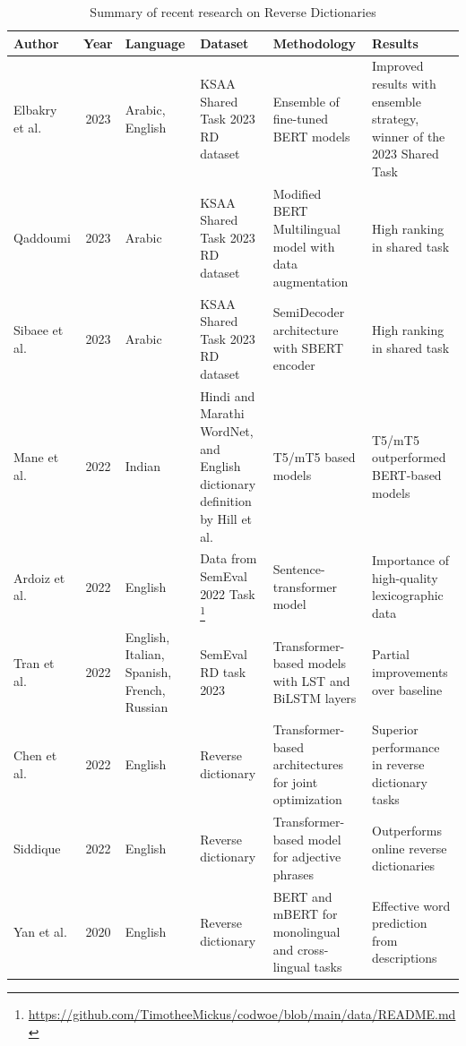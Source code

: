 \documentclass[12.5pt]{article}
\begin{document}
\begin{table}
    \centering
    \caption{Summary of recent research on Reverse Dictionaries}
    \small
    \renewcommand{\arraystretch}{1.75}
    \begin{tabularx}{\textwidth}{|l|c|L{0.4}|L{1}|L{1.4}|L{1.2}|}
        \hline
        \textbf{Author} & \textbf{Year} &  \textbf{Language} & \textbf{Dataset} & \textbf{Methodology} & \textbf{Results} \\
        \hline
        Elbakry et al. \cite{Albakry2023} & 2023 & Arabic, English & KSAA Shared Task 2023 RD dataset & Ensemble of fine-tuned BERT models & Improved results with ensemble strategy, winner of the 2023 Shared Task \\
        \hline
        Qaddoumi \cite{Qaddoumi2023} & 2023 & Arabic & KSAA Shared Task 2023 RD dataset & Modified BERT Multilingual model with data augmentation & High ranking in shared task \\
        \hline
        Sibaee et al. \cite{Sibaee2023} & 2023 & Arabic & KSAA Shared Task 2023 RD dataset & SemiDecoder architecture with SBERT encoder & High ranking in shared task \\
        \hline
        Mane et al. \cite{Mane2022} & 2022 & Indian & Hindi and Marathi WordNet, and English dictionary deﬁnition by Hill et al. \cite{Hill2016} & T5/mT5 based models & T5/mT5 outperformed BERT-based models \\
        \hline
        Ardoiz et al. \cite{Ardoiz2022} & 2022 & English & Data from SemEval 2022 Task \footnote{\href{https://github.com/TimotheeMickus/codwoe/blob/main/data/README.md}{https://github.com/TimotheeMickus/codwoe/blob/main/data/README.md}} & Sentence-transformer model & Importance of high-quality lexicographic data \\
        \hline
        Tran et al.\cite{Tran2022} & 2022 & English, Italian, Spanish, French, Russian & SemEval RD task 2023 & Transformer-based models with LST and BiLSTM layers & Partial improvements over baseline \\
        \hline
        Chen et al. \cite{Chen2022} & 2022 & English & Reverse dictionary & Transformer-based architectures for joint optimization & Superior performance in reverse dictionary tasks \\
        \hline
        Siddique \cite{Siddique2022} & 2022 & English & Reverse dictionary & Transformer-based model for adjective phrases & Outperforms online reverse dictionaries \\
        \hline
        Yan et al. \cite{Yan2020} & 2020 & English & Reverse dictionary & BERT and mBERT for monolingual and cross-lingual tasks & Effective word prediction from descriptions \\

\end{tabularx}
\end{table}
\end{document}
